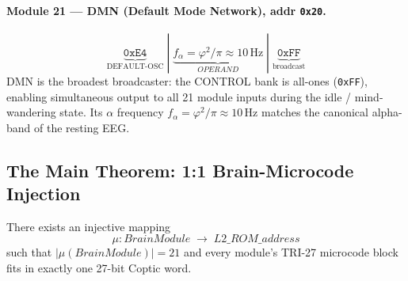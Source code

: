\paragraph{Module 21 — DMN (Default Mode Network), addr \texttt{0x20}.}
\[
  \underbrace{\mathtt{0xE4}}_{\text{DEFAULT-OSC}}
  \;|\;
  \underbrace{f_{\alpha} = \varphi^{2}/\pi \approx 10\,\text{Hz}}_{OPERAND}
  \;|\;
  \underbrace{\mathtt{0xFF}}_{\text{broadcast}}
\]
DMN is the broadest broadcaster: the CONTROL bank is all-ones
(\texttt{0xFF}), enabling simultaneous output to all 21 module
inputs during the idle / mind-wandering state.
Its $\alpha$ frequency $f_{\alpha} = \varphi^{2}/\pi \approx 10\,\mathrm{Hz}$
matches the canonical alpha-band of the resting EEG.

\subsection{The Main Theorem: 1:1 Brain-Microcode Injection}
\label{sec:73:theorem}

\begin{theorem}
\label{thm:brain-injection}
There exists an injective mapping
\[
  \mu : \mathit{BrainModule} \;\longrightarrow\; L2\_ROM\_\mathit{address}
\]
such that $|\mu(\mathit{BrainModule})| = 21$ and every module's
TRI-27 microcode block fits in exactly one 27-bit Coptic word.
\end{theorem}

